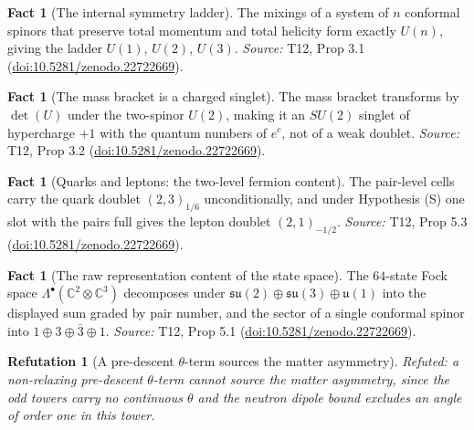\documentclass[11pt]{article}
\newtheorem{refutation}[theorem]{Refutation}
\theoremstyle{definition}
\newtheorem{fact}[theorem]{Fact}
\theoremstyle{plain}
\providecommand{\C}{}\renewcommand{\C}{\mathbb{C}}
\providecommand{\su}{}\renewcommand{\su}{\mathfrak{su}}
\providecommand{\uu}{}\renewcommand{\uu}{\mathfrak{u}}
\begin{document}
\begin{fact}[The internal symmetry ladder]\label{c:standard-model.internal-symmetry-ladder}
The mixings of a system of $n$ conformal spinors that preserve total momentum and total helicity form exactly $U(n)$, giving the ladder $U(1)$, $U(2)$, $U(3)$.
\emph{Source:} T12, Prop 3.1 (\href{https://doi.org/10.5281/zenodo.22722669}{doi:10.5281/zenodo.22722669}).
\end{fact}

\begin{fact}[The mass bracket is a charged singlet]\label{c:standard-model.mass-bracket-charged-singlet}
The mass bracket transforms by $\det(U)$ under the two-spinor $U(2)$, making it an $SU(2)$ singlet of hypercharge $+1$ with the quantum numbers of $e^{c}$, not of a weak doublet.
\emph{Source:} T12, Prop 3.2 (\href{https://doi.org/10.5281/zenodo.22722669}{doi:10.5281/zenodo.22722669}).
\end{fact}

\begin{fact}[Quarks and leptons: the two-level fermion content]\label{c:standard-model.quarks-leptons-two-level-fermion-content}
The pair-level cells carry the quark doublet $(2,3)_{1/6}$ unconditionally, and under Hypothesis (S) one slot with the pairs full gives the lepton doublet $(2,1)_{-1/2}$.
\emph{Source:} T12, Prop 5.3 (\href{https://doi.org/10.5281/zenodo.22722669}{doi:10.5281/zenodo.22722669}).
\end{fact}

\begin{fact}[The raw representation content of the state space]\label{c:standard-model.raw-representation-content-state-space}
The $64$-state Fock space $\Lambda^{\bullet}(\C^{2} \otimes \C^{3})$ decomposes under $\su(2) \oplus \su(3) \oplus \uu(1)$ into the displayed sum graded by pair number, and the sector of a single conformal spinor into $1 \oplus 3 \oplus \bar{3} \oplus 1$.
\emph{Source:} T12, Prop 5.1 (\href{https://doi.org/10.5281/zenodo.22722669}{doi:10.5281/zenodo.22722669}).
\end{fact}

\begin{refutation}[A pre-descent $\theta$-term sources the matter asymmetry]\label{c:refuted.a-pre-descent-term-sources-the-matter-asymmetry}
Refuted: a non-relaxing pre-descent $\theta$-term cannot source the matter asymmetry, since the odd towers carry no continuous $\theta$ and the neutron dipole bound excludes an angle of order one in this tower.
\end{refutation}
\end{document}
